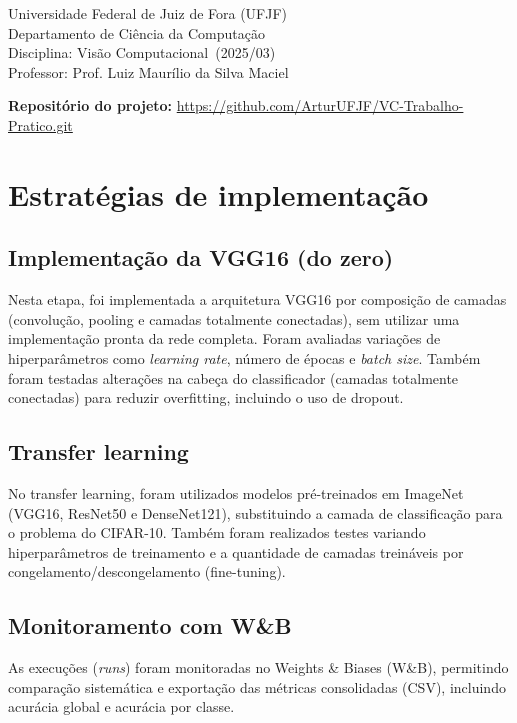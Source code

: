 \documentclass[12pt,a4paper]{article}
\title{\tituloTrabalho}
\author{\autores}
\date{\dataRelatorio}
\newcommand{\instituicao}{Universidade Federal de Juiz de Fora (UFJF)}
\newcommand{\departamento}{Departamento de Ciência da Computação}
\newcommand{\disciplina}{Visão Computacional}
\newcommand{\professor}{Prof. Luiz Maurílio da Silva Maciel}
\newcommand{\semestre}{2025/03}
\begin{document}
\maketitle

\begin{center}
\instituicao\\
\departamento\\
Disciplina: \disciplina\ (\semestre)\\
Professor: \professor
\end{center}

\vspace{0.4cm}

\noindent\textbf{Repositório do projeto:} \url{https://github.com/ArturUFJF/VC-Trabalho-Pratico.git}

\section{Estratégias de implementação}

\subsection{Implementação da VGG16 (do zero)}
Nesta etapa, foi implementada a arquitetura VGG16 por composição de camadas (convolução, pooling e camadas totalmente conectadas), sem utilizar uma implementação pronta da rede completa.
Foram avaliadas variações de hiperparâmetros como \textit{learning rate}, número de épocas e \textit{batch size}.
Também foram testadas alterações na cabeça do classificador (camadas totalmente conectadas) para reduzir overfitting, incluindo o uso de dropout.

\subsection{Transfer learning}
No transfer learning, foram utilizados modelos pré-treinados em ImageNet (VGG16, ResNet50 e DenseNet121), substituindo a camada de classificação para o problema do CIFAR-10.
Também foram realizados testes variando hiperparâmetros de treinamento e a quantidade de camadas treináveis por congelamento/descongelamento (fine-tuning).

\subsection{Monitoramento com W\&B}
As execuções (\textit{runs}) foram monitoradas no Weights \& Biases (W\&B), permitindo comparação sistemática e exportação das métricas consolidadas (CSV), incluindo acurácia global e acurácia por classe.
\end{document}
